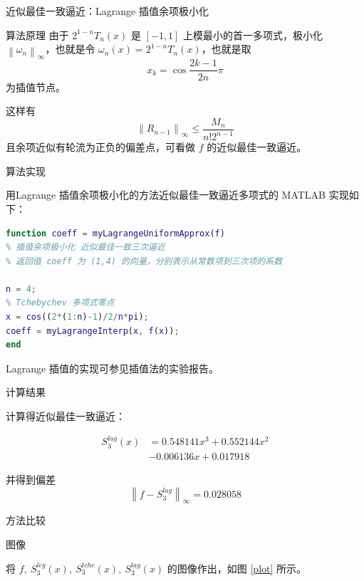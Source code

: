 \documentclass[a4paper]{article}
\begin{document}
\begin{multicols}{2}
\begin{section}{近似最佳一致逼近：Lagrange 插值余项极小化}
\begin{subsection}{算法原理}
		由于 $2^{1-n} T_{n}(x)$ 是 $[-1,1]$ 上模最小的首一多项式，极小化 $\left\|\omega_{n} \right\|_{\infty}$，也就是令 $\omega_{n}(x)=2^{1-n} T_{n}(x)$，也就是取 $$x_{k}=\cos \frac{2 k-1}{2 n} \pi$$ 为插值节点。
		
		这样有 $$\left\|R_{n-1}\right\|_{\infty} \leq \frac{M_{n}}{n !2^{n-1}}$$ 且余项近似有轮流为正负的偏差点，可看做 $f$ 的近似最佳一致逼近。
		
	\end{subsection}
	
	\begin{subsection}{算法实现}
	
		用Lagrange 插值余项极小化的方法近似最佳一致逼近多项式的 MATLAB 实现如下：
		
\begin{lstlisting}[language=Matlab]
function coeff = myLagrangeUniformApprox(f)
% 插值余项极小化 近似最佳一致三次逼近
% 返回值 coeff 为 (1,4) 的向量，分别表示从常数项到三次项的系数

n = 4;
% Tchebychev 多项式零点
x = cos((2*(1:n)-1)/2/n*pi);
coeff = myLagrangeInterp(x, f(x));
end
\end{lstlisting}
	
		Lagrange 插值的实现可参见插值法的实验报告。
		
	\end{subsection}
	
	\begin{subsection}{计算结果}
	
		计算得近似最佳一致逼近：
		
		\begin{equation} \nonumber
			\begin{aligned} S_3^{lag}(x)&=0.548141x^3+0.552144x^2\\&-0.006136x+0.017918 \end{aligned}	
		\end{equation}
		
		并得到偏差 $$\left\|f-S_3^{lag}\right\|_{\infty} = 0.028058$$
		
	\end{subsection}
	
\end{section}

\begin{section}{方法比较}
	
	\begin{subsection}{图像}
	
		将 $f,\ S_3^{leg}(x),\ S_3^{tche}(x),\ S_3^{lag}(x)$ 的图像作出，如图 \ref{plot} 所示。
		

\end{subsection}
\end{section}
\end{multicols}
\end{document}
